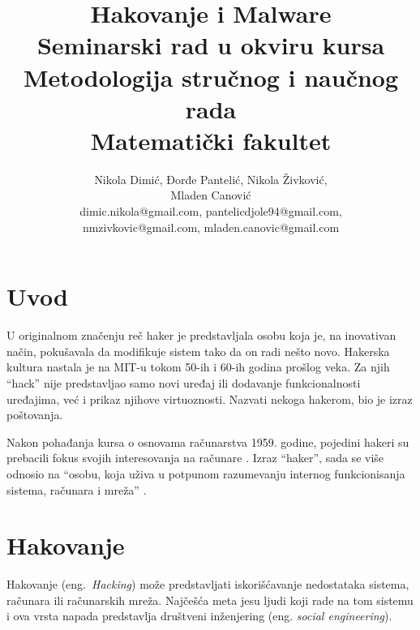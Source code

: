 \documentclass[a4paper]{article}
\begin{document}
\title{Hakovanje i Malware\\ \small{Seminarski rad u okviru kursa\\Metodologija stručnog i naučnog rada\\ Matematički fakultet}}

\author{Nikola Dimić, Đorđe Pantelić, Nikola Živković,\\Mladen Canović\\ dimic.nikola@gmail.com, pantelicdjole94@gmail.com,\\nmzivkovic@gmail.com, mladen.canovic@gmail.com}


\maketitle


\setcounter{tocdepth}{2}
\tableofcontents

\newpage

\section{Uvod}
\label{sec:uvod}
U originalnom značenju reč haker je predstavljala osobu koja je, na inovativan način, pokušavala da modifikuje sistem tako da on radi nešto novo. Hakerska kultura nastala je na MIT-u tokom 50-ih i 60-ih godina prošlog veka. Za njih “hack” nije predstavljao samo novi uređaj ili dodavanje funkcionalnosti uređajima, već i prikaz njihove virtuoznosti. Nazvati nekoga hakerom, bio je izraz poštovanja.

Nakon pohađanja kursa o osnovama računarstva 1959. godine, pojedini hakeri su prebacili fokus svojih interesovanja na računare \cite{hackers_heroes}. Izraz “haker”, sada se više odnosio na “osobu, koja uživa u potpunom razumevanju internog funkcionisanja sistema, računara i mreža” \cite{hacker_definition}.



\section{Hakovanje}
Hakovanje (eng.~{\em Hacking}) može predstavljati iskorišćavanje nedostataka sistema, računara ili računarskih mreža. Najčešća meta jesu ljudi koji rade na tom sistemu i ova vrsta napada predstavlja društveni inženjering (eng. \textit{social engineering}).
\end{document}
